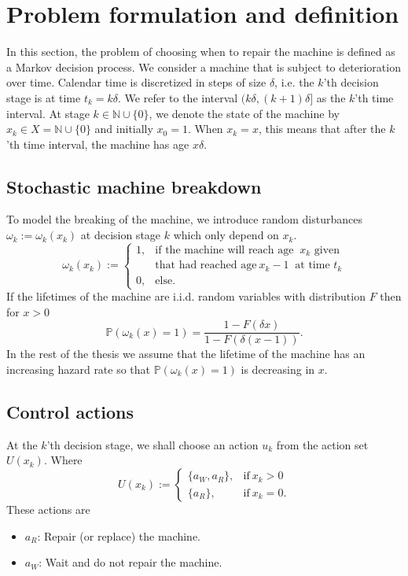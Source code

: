 \section{Problem formulation and definition}\label{section:AgeBasedDefinition}
In this section, the problem of choosing when to repair the machine is defined as a Markov decision process.
We consider a machine that is subject to deterioration over time.
Calendar time is discretized in steps of size $\delta$, i.e. the $k$'th decision stage is at time $t_k=k\delta$.
We refer to the interval $(k\delta,(k+1)\delta]$ as the $k$'th time interval.
At stage $k\in\mathbb{N}\cup\{0\}$, we denote the state of the machine by $x_k\in X=\mathbb{N}\cup\{0\}$ and initially $x_0=1$.
When $x_k=x$, this means that after the $k$'th time interval, the machine has age $x\delta$.

\subsection{Stochastic machine breakdown}
To model the breaking of the machine, we introduce random disturbances $\omega_k:=\omega_k(x_k)$ at decision stage $k$ which only depend on $x_k$.
$$
\omega_k(x_k):=\begin{cases}
1,&\text{if the machine will reach age }\ x_{k}\text{ given}\\
&\text{that had reached age}\ x_k-1\ \text{ at time } t_k \\
0,&\text{else}.
\end{cases}
$$
If the lifetimes of the machine are i.i.d. random variables with distribution $F$ then for $x>0$
$$
\mathbb{P}(\omega_k(x)=1)=\frac{1-F(\delta x)}{1-F(\delta (x-1))}.
$$
In the rest of the thesis we assume that the lifetime of the machine has an increasing hazard rate so that $\mathbb{P}(\omega_k(x)=1)$ is decreasing in $x$.

\subsection{Control actions}
At the $k$'th decision stage, we shall choose an action $u_k$ from the action set $U(x_k)$.
Where
$$
U(x_k):=\begin{cases}
\{a_W,a_R\},&\text{if}\ x_k>0 \\
\{a_R\},&\text{if}\ x_k=0.
\end{cases}
$$
These actions are
\begin{itemize}
	\item $a_R$:
	Repair (or replace) the machine.
	\item $a_W$:
	Wait and do not repair the machine.
\end{itemize}

